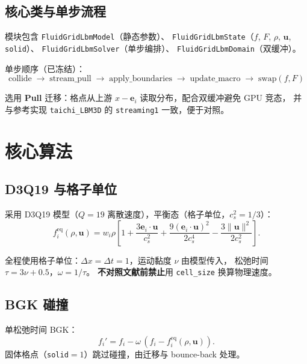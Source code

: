 \documentclass[UTF8,a4paper,11pt]{ctexart}
\newcommand{\vecu}{\mathbf{u}}
\newcommand{\vece}{\mathbf{e}}
\newcommand{\feq}{f^{\mathrm{eq}}}
\newcommand{\dt}{\Delta t}
\newcommand{\dx}{\Delta x}
\newcommand{\cs}{c_s}
\begin{document}
\subsection{核心类与单步流程}

模块包含 \texttt{FluidGridLbmModel}（静态参数）、
\texttt{FluidGridLbmState}（$f$, $F$, $\rho$, $\vecu$, \texttt{solid}）、
\texttt{FluidGridLbmSolver}（单步编排）、
\texttt{FluidGridLbmDomain}（双缓冲）。

单步顺序（已冻结）：
\begin{equation}
  \text{collide} \;\to\; \text{stream\_pull} \;\to\;
  \text{apply\_boundaries} \;\to\; \text{update\_macro} \;\to\; \text{swap}(f, F)
\end{equation}

选用 \textbf{Pull} 迁移：格点从上游 $x-\vece_i$ 读取分布，配合双缓冲避免 GPU 竞态，
并与参考实现 \texttt{taichi\_LBM3D} 的 \texttt{streaming1} 一致，便于对照。

\section{核心算法}

\subsection{D3Q19 与格子单位}

采用 D3Q19 模型（$Q=19$ 离散速度），平衡态（格子单位，$\cs^2=1/3$）：
\begin{equation}
  \feq_i(\rho, \vecu) = w_i \rho \left[
    1 + \frac{3\vece_i\cdot\vecu}{\cs^2}
    + \frac{9(\vece_i\cdot\vecu)^2}{2\cs^4}
    - \frac{3\|\vecu\|^2}{2\cs^2}
  \right].
\end{equation}

全程使用格子单位：$\dx=\dt=1$，运动黏度 $\nu$ 由模型传入，
松弛时间 $\tau = 3\nu + 0.5$，$\omega = 1/\tau$。
\textbf{不对照文献前禁止}用 \texttt{cell\_size} 换算物理速度。

\subsection{BGK 碰撞}

单松弛时间 BGK：
\begin{equation}
  f_i' = f_i - \omega\,(f_i - \feq_i(\rho, \vecu)).
\end{equation}
固体格点（\texttt{solid}$=1$）跳过碰撞，由迁移与 bounce-back 处理。
\end{document}
